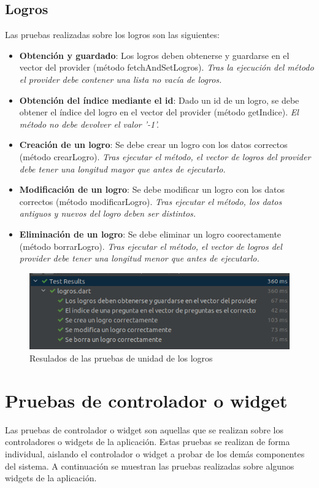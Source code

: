 \subsection{Logros}
\label{subsec:pruebas-unidad-logros}
Las pruebas realizadas sobre los logros son las siguientes:
\begin{itemize}
    \item \textbf{Obtención y guardado}: Los logros deben obtenerse y guardarse en el vector del provider (método fetchAndSetLogros). \textit{Tras la ejecución del método el provider debe contener una lista no vacía de logros.}
    \item \textbf{Obtención del índice mediante el id}: Dado un id de un logro, se debe obtener el índice del logro en el vector del provider (método getIndice). \textit{El método no debe devolver el valor '-1'.}
    \item \textbf{Creación de un logro}: Se debe crear un logro con los datos correctos (método crearLogro). \textit{Tras ejecutar el método, el vector de logros del provider debe tener una longitud mayor que antes de ejecutarlo.}
    \item \textbf{Modificación de un logro}: Se debe modificar un logro con los datos correctos (método modificarLogro). \textit{Tras ejecutar el método, los datos antiguos y nuevos del logro deben ser distintos.}
    \item \textbf{Eliminación de un logro}: Se debe eliminar un logro coorectamente (método borrarLogro). \textit{Tras ejecutar el método, el vector de logros del provider debe tener una longitud menor que antes de ejecutarlo.}
\end{itemize}

\begin{figure}[H]
    \centering
    \includegraphics[width=\textwidth]{imagenes/c8/pruebalogros.png}
    \caption{Resulados de las pruebas de unidad de los logros}
    \label{fig:pruebas_unidad_logros}
\end{figure}


\section*{Pruebas de controlador o widget}
\label{sec:pruebas-controlador}
Las pruebas de controlador o widget son aquellas que se realizan sobre los controladores o widgets de la aplicación. Estas pruebas se realizan de forma individual, aislando el controlador o widget a probar de los demás componentes del sistema.
A continuación se muestran las pruebas realizadas sobre algunos widgets de la aplicación.

